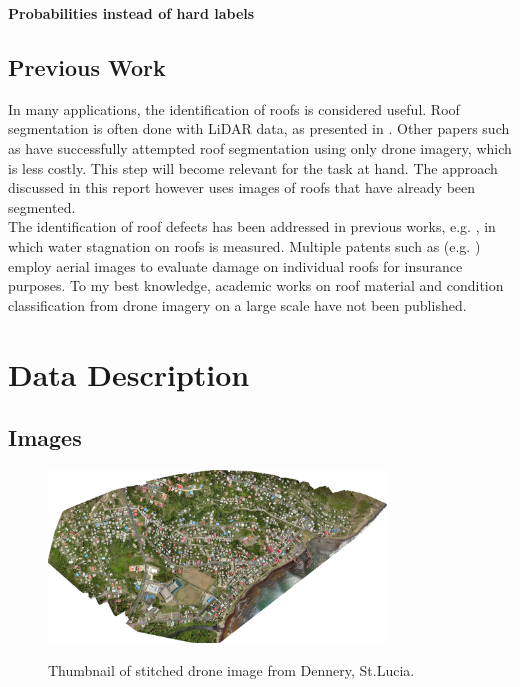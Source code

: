 \documentclass[11pt]{article}
\begin{document}
	\textbf{Probabilities instead of hard labels}
	
	\subsection{Previous Work}
	
	In many applications, the identification of roofs is considered useful. Roof segmentation is often done with LiDAR data, as presented in \cite{Chen2012}. Other papers such as \cite{Soman2019} have successfully attempted roof segmentation using only drone imagery, which is less costly. This step will become relevant for the task at hand. The approach discussed in this report however uses images of roofs that have already been segmented.\\
	
	The identification of roof defects has been addressed in previous works, e.g. \cite{Yudin2018}, in which water stagnation on roofs is measured. Multiple patents such as (e.g. \cite{Shreve2017}) employ aerial images to evaluate damage on individual roofs for insurance purposes. To my best knowledge, academic works on roof material and condition classification from drone imagery on a large scale have not been published. 
	
	\section{Data Description}
	
	\subsection{Images}
		
	\begin{figure}
		\centering		
		\includegraphics[width=0.8\textwidth]{figures/thumbnail_dennery.png}
		\label{fig:thumbnail_dennery}
		\caption{Thumbnail of stitched drone image from Dennery, St.Lucia.}
	\end{figure}
\end{document}
